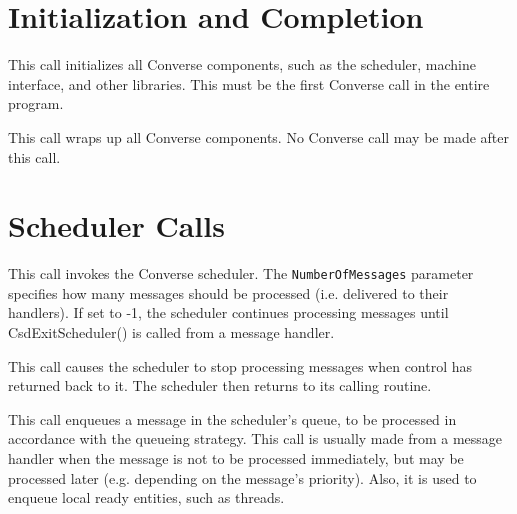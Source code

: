 
\section{Initialization and Completion}


This call initializes all Converse components, such as the scheduler,
machine interface, and other libraries. This must be the first Converse
call in the entire program.


This call wraps up all Converse components. No Converse call may be made
after this call.




\section{Scheduler Calls}



This call invokes the Converse scheduler. The {\tt NumberOfMessages}
parameter specifies how many messages should be processed (i.e. delivered
to their handlers). If set to -1, the scheduler continues processing
messages until CsdExitScheduler() is called from a message handler.

This call causes the scheduler
to stop processing messages when control has returned back to it.
The scheduler then returns to its calling routine.

This call enqueues a message in the scheduler's queue, to be processed
in accordance with the queueing strategy. This call is usually made from
a message handler when the message is not to be processed immediately,
but may be processed later (e.g. depending on the message's priority).
Also, it is used to enqueue local ready entities, such as threads.
